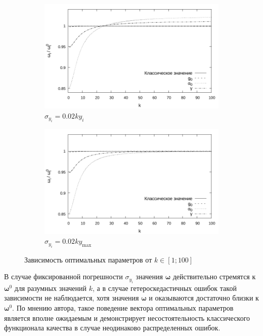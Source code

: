 \documentclass[tikz,10pt,a4paper]{article}
\newcommand{\bomega}{\boldsymbol{\omega}}
\begin{document}
\begin{figure}[h]
  \centering
  \begin{subfigure}[b]{0.5\textwidth}
    \includegraphics[width=\textwidth]{figs/levmar/convergence/convergence_1_100_0.01_yi.txt_bw.pdf}
	\caption{$\sigma_{y_i} = 0.02ky_i$}
	\label{fig:conv_varY_100}
  \end{subfigure}%
  \begin{subfigure}[b]{0.5\textwidth}
    \includegraphics[width=\textwidth]{figs/levmar/convergence/convergence_1_100_0.01_ymax.txt_bw.pdf}
	\caption{$\sigma_{y_i} = 0.02ky_{\max}$}
	\label{fig:conv_fixedY_100}
  \end{subfigure}
  \caption{Зависимость оптимальных параметров от $k \in [1; 100]$}
  \label{fig:conv_varY}
\end{figure}

В случае фиксированной погрешности $\sigma_{y_i}$ значения $\bomega$
действительно стремятся к $\bomega^0$ для разумных значений $k$, а в случае
гетероскедастичных ошибок такой зависимости не наблюдается, хотя значения $\bomega$
и оказываются достаточно близки к $\bomega^0$. По мнению автора, такое поведение
вектора оптимальных параметров является вполне ожидаемым и демонстрирует
несостоятельность классического функционала качества в случае неодинаково
распределенных ошибок.
\end{document}

